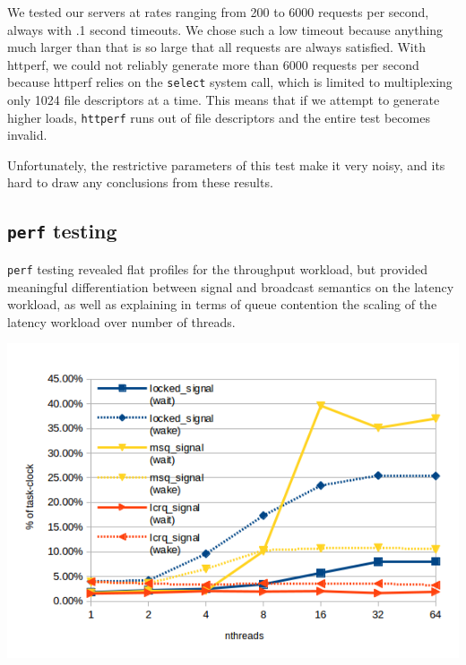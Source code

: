 \documentclass[twoside,10pt]{article}
\newenvironment{Figure}
  {\par\medskip\noindent\minipage{\linewidth}}
  {\endminipage\par\medskip}
\begin{document}
\begin{multicols}{2}
We tested our servers at rates ranging from 200 to 6000 requests per
second, always with .1 second timeouts. We chose such a low timeout
because anything much larger than that is so large that all requests
are always satisfied. With httperf, we could not reliably generate
more than 6000 requests per second because httperf relies on the
\verb+select+ system call, which is limited to multiplexing only 1024
file descriptors at a time. This means that if we attempt to generate
higher loads, \verb+httperf+ runs out of file descriptors and the
entire test becomes invalid.

Unfortunately, the restrictive parameters of this test make it very noisy, 
and its hard to draw any conclusions from these results. 

\subsection{\texttt{perf} testing}

\verb+perf+ testing revealed flat profiles for the throughput
workload, but provided meaningful differentiation between signal and
broadcast semantics on the latency workload, as well as explaining in
terms of queue contention the scaling of the latency workload over
number of threads.

\begin{Figure}
\includegraphics[width=\linewidth]{img/perf-latency-nthreads.png}
\end{Figure}


\end{multicols}
\end{document}
